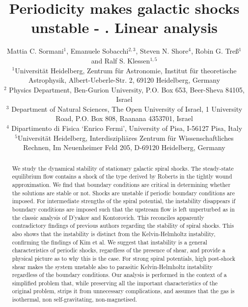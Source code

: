 \documentclass[useAMS,usenatbib]{mn2e}
\title[Periodicity makes shocks unstable]{Periodicity makes galactic shocks unstable - \rom{1}. Linear analysis}
\author[Sormani, Sobacchi, Shore, Tre{\ss} \& Klessen]{Mattia C. Sormani$^{1}$, Emanuele Sobacchi$^{2,3}$, Steven N. Shore$^{4}$, Robin G. Tre{\ss}$^1$ \newauthor and Ralf S. Klessen$^{1,5}$\\
$^1$Universit\"{a}t Heidelberg, Zentrum f\"{u}r Astronomie, Institut f\"{u}r theoretische Astrophysik, Albert-Ueberle-Str. 2, 69120 Heidelberg, Germany \\
$^2$ Physics Department, Ben-Gurion University, P.O. Box 653, Beer-Sheva 84105, Israel\\
$^3$ Department of Natural Sciences, The Open University of Israel, 1 University Road, P.O. Box 808, Raanana 4353701, Israel \\
$^4$ Dipartimento di Fisica `Enrico Fermi', University of Pisa, I-56127 Pisa, Italy\\
$^5$Universit\"at Heidelberg, Interdiszipli\"ares Zentrum f\"ur Wissenschaftliches Rechnen, Im Neuenheimer Feld 205, D-69120 Heidelberg, Germany
}
\begin{document}
\date{}

\def\p{\partial}
\def\Omegap{\Omega_{\rm p}}

\newcommand{\di}{\mathrm{d}}
\newcommand{\bfx}{\mathbf{x}}
\newcommand{\bfe}{\mathbf{e}}
\newcommand{\vlos}{\mathrm{v}_{\rm los}}
\newcommand{\Tspin}{T_{\rm s}}
\newcommand{\Tb}{T_{\rm b}}
\newcommand{\degree}{\ensuremath{^\circ}}
\newcommand{\Th}{T_{\rm h}}
\newcommand{\Tc}{T_{\rm c}}
\newcommand{\bfr}{\mathbf{r}}
\newcommand{\bfv}{\mathbf{v}}
\newcommand{\bfu}{\mathbf{u}}
\newcommand{\pc}{\,{\rm pc}}
\newcommand{\kpc}{\,{\rm kpc}}
\newcommand{\Myr}{\,{\rm Myr}}
\newcommand{\Gyr}{\,{\rm Gyr}}
\newcommand{\kms}{\,{\rm km\, s^{-1}}}
\newcommand{\kmssq}{\,{\rm km^2\, s^{-2}}}
\newcommand{\de}[2]{\frac{\partial #1}{\partial {#2}}}
\newcommand{\cs}{c_{\rm s}}
\newcommand{\rb}{r_{\rm b}}
\newcommand{\rqu}{r_{\rm q}}
\newcommand{\bfOmega}{{\Omega}}
\newcommand{\bfOmegap}{{\Omega}_{\rm p}}
\newcommand{\bfXi}{\boldsymbol{\Xi}}
\newcommand{\imi}{i}
\makeatletter
\newcommand*{\rom}[1]{\expandafter\@slowromancap\romannumeral #1@}
\makeatother

\maketitle

\begin{abstract}
%
We study the dynamical stability of stationary galactic spiral shocks. The steady-state equilibrium flow contains a shock of the type derived by Roberts in the tightly wound approximation. We find that boundary conditions are critical in determining whether the solutions are stable or not. Shocks are unstable if periodic boundary conditions are imposed. For intermediate strengths of the spiral potential, the instability disappears if boundary conditions are imposed such that the upstream flow is left unperturbed as in the classic analysis of D'yakov and Kontorovich. This reconciles apparently contradictory findings of previous authors regarding the stability of spiral shocks. This also shows that the instability is distinct from the Kelvin-Helmholtz instability, confirming the findings of Kim et al. We suggest that instability is a general characteristics of periodic shocks, regardless of the presence of shear, and provide a physical picture as to why this is the case. For strong spiral potentials, high post-shock shear makes the system unstable also to parasitic Kelvin-Helmholtz instability regardless of the boundary conditions. Our analysis is performed in the context of a simplified problem that, while preserving all the important characteristics of the original problem, strips it from unnecessary complications, and assumes that the gas is isothermal, non self-gravitating, non-magnetised.
%
\end{abstract}
\end{document}
